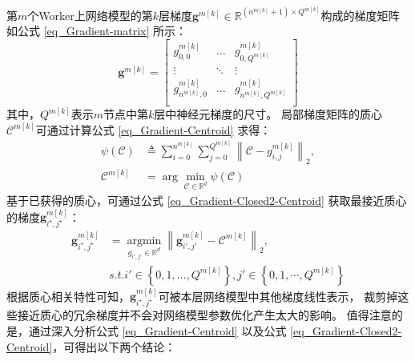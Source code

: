 \documentclass{xdupgthesis}
\begin{document}
第$m$个Worker上网络模型的第$k$层梯度$\mathbf{g}^{m[k]}\in \mathbb{R}^{\left(n^{m[k]}+1 \right) \times Q^{m[k]}}$构成的梯度矩阵如公式 \eqref{eq_Gradient-matrix} 所示：
\begin{equation}
  \mathbf{g}^{m[k]} =
  \begin{bmatrix}
          g^{m[k]}_{0, 0} & \dots  &  g^{m[k]}_{0, Q^{m[k]}} \\
          \vdots        & \ddots & \vdots \\
          g^{m[k]}_{n^{m[k]}, 0} & \dots  & g^{m[k]}_{n^{m[k]}, Q^{m[k]}} \\
  \end{bmatrix}%
  \label{eq_Gradient-matrix}
\end{equation}
其中，$Q^{m[k]}$表示$m$节点中第$k$层中神经元梯度的尺寸。
局部梯度矩阵的质心$\mathcal{C}^{m[k]}$可通过计算公式 \eqref{eq_Gradient-Centroid} 求得：
\begin{equation}
    \begin{aligned}
        \psi \left(\mathcal{C}\right) & \triangleq
            \sum_{i = 0}^{n^{m[k]}} \sum_{j = 0}^{Q^{m[k]}}
                \left\lVert \mathcal{C} - g_{i,j}^{m[k]} \right\rVert_{2}, \\
        \mathcal{C}^{m[k]} &=
            \arg \min_{\mathcal{C}\in \mathbb{R}^{d}}\psi\left(\mathcal{C}\right)
    \end{aligned}
    \label{eq_Gradient-Centroid}
\end{equation}
基于已获得的质心，可通过公式 \eqref{eq_Gradient-Closed2-Centroid} 获取最接近质心的梯度$\mathbf{g}_{i^{\star}, j^{\star}}^{m[k]}$：
\begin{equation}
    \begin{aligned}
        \mathbf{g}_{i^{\star}, j^{\star}}^{m[k]} & =
            \mathop{\arg\min}\limits_{g_{i', j'} \in \mathbb{R}^{d}}
                {\left\lVert \mathbf{g}_{i', j'}^{m[k]} - \mathcal{C}^{m[k]} \right\rVert}_2, \\
        & s.t. i'\in \left\{0, 1, \dots, Q^{m[k]}\right\}, j'\in \left\{0, 1, \cdots, Q^{m[k]} \right\}
    \end{aligned}
    \label{eq_Gradient-Closed2-Centroid}
\end{equation}
根据质心相关特性可知，$\mathbf{g}_{i^{\star}, j^{\star}}^{m[k]}$可被本层网络模型中其他梯度线性表示，
裁剪掉这些接近质心的冗余梯度并不会对网络模型参数优化产生太大的影响。
值得注意的是，通过深入分析公式 \eqref{eq_Gradient-Centroid} 
以及公式 \eqref{eq_Gradient-Closed2-Centroid}，可得出以下两个结论：
\end{document}
